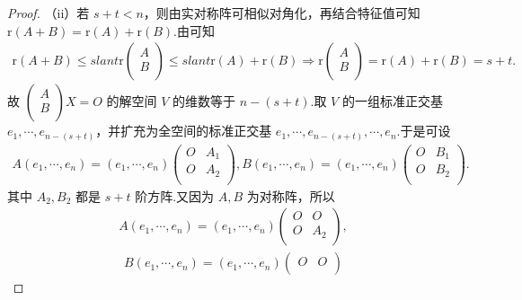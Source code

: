 \documentclass[../../main.tex]{subfiles}
\begin{document}
\begin{proof}
（ii）若 $s+t<n$，则由实对称阵可相似对角化，再结合特征值可知 $\mathrm{r}\left( A+B \right) =\mathrm{r}\left( A \right) +\mathrm{r}\left( B \right) $.由可知
\begin{align*}
\mathrm{r}\left( A+B \right) \leqslant slant \mathrm{r}\begin{pmatrix}
A\\
B\\
\end{pmatrix} \leqslant slant \mathrm{r}\left( A \right) +\mathrm{r}\left( B \right) \Longrightarrow \mathrm{r}\begin{pmatrix}
A\\
B\\
\end{pmatrix} =\mathrm{r}\left( A \right) +\mathrm{r}\left( B \right) =s+t.
\end{align*}
故 $\begin{pmatrix}
A\\
B\\
\end{pmatrix} X=O$ 的解空间 $V$ 的维数等于 $n-\left( s+t \right) $.取 $V$ 的一组标准正交基 $e_1,\cdots ,e_{n-\left( s+t \right)}$，并扩充为全空间的标准正交基 $e_1,\cdots ,e_{n-\left( s+t \right)},\cdots ,e_n$.于是可设
\begin{align*}
A\left( e_1,\cdots ,e_n \right) =\left( e_1,\cdots ,e_n \right) \begin{pmatrix}
O&		A_1\\
O&		A_2\\
\end{pmatrix},B\left( e_1,\cdots ,e_n \right) =\left( e_1,\cdots ,e_n \right) \begin{pmatrix}
O&		B_1\\
O&		B_2\\
\end{pmatrix}.
\end{align*}
其中 $A_2,B_2$ 都是 $s+t$ 阶方阵.又因为 $A,B$ 为对称阵，所以
\begin{align*}
A\left( e_1,\cdots ,e_n \right) =\left( e_1,\cdots ,e_n \right) \begin{pmatrix}
O&		O\\
O&		A_2\\
\end{pmatrix},
\end{align*}
\begin{align*}
B\left( e_1,\cdots ,e_n \right) =\left( e_1,\cdots ,e_n \right) \begin{pmatrix}
O&		O\\

\end{pmatrix}
\end{align*}
\end{proof}
\end{document}
